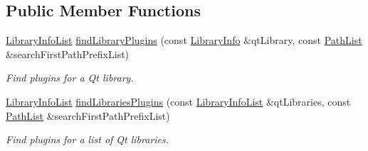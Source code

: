 \subsection*{Public Member Functions}
\begin{DoxyCompactItemize}
\item 
\hyperlink{class_mdt_1_1_deploy_utils_1_1_library_info_list}{Library\+Info\+List} \hyperlink{class_mdt_1_1_deploy_utils_1_1_qt_library_a4b3c9f30edc9bea8904205eb450e9060}{find\+Library\+Plugins} (const \hyperlink{class_mdt_1_1_deploy_utils_1_1_library_info}{Library\+Info} \&qt\+Library, const \hyperlink{class_mdt_1_1_deploy_utils_1_1_path_list}{Path\+List} \&search\+First\+Path\+Prefix\+List)
\begin{DoxyCompactList}\small\item\em Find plugins for a Qt library. \end{DoxyCompactList}\item 
\hyperlink{class_mdt_1_1_deploy_utils_1_1_library_info_list}{Library\+Info\+List} \hyperlink{class_mdt_1_1_deploy_utils_1_1_qt_library_a268a9e397c091779eb5f961f40c7d3e6}{find\+Libraries\+Plugins} (const \hyperlink{class_mdt_1_1_deploy_utils_1_1_library_info_list}{Library\+Info\+List} \&qt\+Libraries, const \hyperlink{class_mdt_1_1_deploy_utils_1_1_path_list}{Path\+List} \&search\+First\+Path\+Prefix\+List)
\begin{DoxyCompactList}\small\item\em Find plugins for a list of Qt libraries. \end{DoxyCompactList}\end{DoxyCompactItemize}
